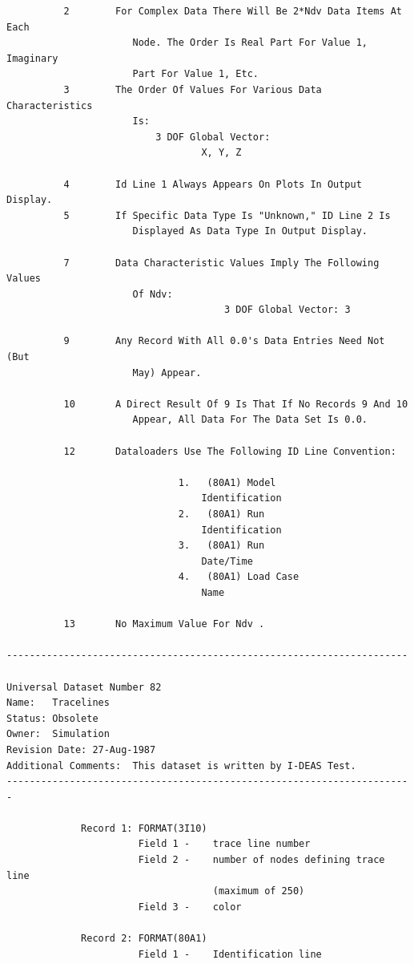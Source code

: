 \documentclass[11pt,openany,twoside]{book}
\numberwithin{equation}{section}		%
\begin{document}
\begin{verbatim}
          2        For Complex Data There Will Be 2*Ndv Data Items At Each
                      Node. The Order Is Real Part For Value 1,  Imaginary
                      Part For Value 1, Etc.
          3        The Order Of Values For Various Data  Characteristics
                      Is:
                          3 DOF Global Vector:
                                  X, Y, Z

          4        Id Line 1 Always Appears On Plots In Output Display.
          5        If Specific Data Type Is "Unknown," ID Line 2 Is
                      Displayed As Data Type In Output Display.

          7        Data Characteristic Values Imply The Following Values
                      Of Ndv:
                                      3 DOF Global Vector: 3

          9        Any Record With All 0.0's Data Entries Need Not (But
                      May) Appear.

          10       A Direct Result Of 9 Is That If No Records 9 And 10
                      Appear, All Data For The Data Set Is 0.0.

          12       Dataloaders Use The Following ID Line Convention:

                              1.   (80A1) Model
                                  Identification
                              2.   (80A1) Run
                                  Identification
                              3.   (80A1) Run
                                  Date/Time
                              4.   (80A1) Load Case
                                  Name

          13       No Maximum Value For Ndv .

----------------------------------------------------------------------

Universal Dataset Number 82
Name:   Tracelines
Status: Obsolete
Owner:  Simulation
Revision Date: 27-Aug-1987
Additional Comments:  This dataset is written by I-DEAS Test.
-----------------------------------------------------------------------

             Record 1: FORMAT(3I10)
                       Field 1 -    trace line number
                       Field 2 -    number of nodes defining trace line
                                    (maximum of 250)
                       Field 3 -    color

             Record 2: FORMAT(80A1)
                       Field 1 -    Identification line


\end{verbatim}
\end{document}
